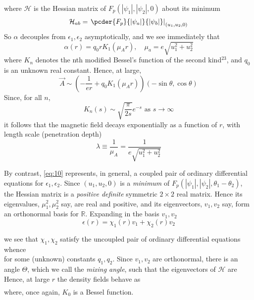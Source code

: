 where \( \mathcal{H} \) is the Hessian matrix of 
\( F_p(|\psi_1|, |\psi_2|, 0) \) about its minimum 
\begin{equation}
    \mathcal{H}_{ab} = \left. \pcder{F_p}{|\psi_a|}{|\psi_b|} 
        \right|_{(u_1, u_2, 0)}
    \label{eq:12}
\end{equation}
So \( \alpha \) decouples from \( \epsilon_1, \epsilon_2\) asymptotically, and 
we see immediately that
\begin{equation}
    \alpha(r) = q_0 r K_1(\mu_A r), \quad
    \mu_a = e\sqrt{u_1^2 + u_2^2}
    \label{eq:13}
\end{equation}
where \( K_n \) denotes the nth modified Bessel’s function of the second 
kind\( ^{23} \), and \( q_0 \) is an unknown real constant. Hence, at large,
\begin{equation}
    \vec{A} \sim \left( -\frac{1}{er} + q_0 K_1(\mu_A r) \right)
        (-\sin\theta, \cos\theta)
    \label{eq:14}
\end{equation}
Since, for all \( n \), 
\begin{equation}
    K_n(s) \sim \sqrt{\frac{\pi}{2s}}e^{-s} \text{ as } s \rightarrow \infty
    \label{eq:15}
\end{equation}
it follows that the magnetic field decays exponentially as a function of 
\( r \), with length scale (penetration depth)
\begin{equation}
    \lambda \equiv \frac{1}{\mu_A} = \frac{1}{e\sqrt{u_1^2 + u_2^2}}
    \label{eq:16}
\end{equation}

By contrast, \eqref{eq:10} represents, in general, a coupled pair of ordinary 
differential equations for \( \epsilon_1, \epsilon_2 \). Since 
\( (u_1, u_2, 0 ) \) is a \textit{minimum} of 
\( F_p(|\psi_1|, |\psi_2|, \theta_1 - \theta_2) \), the Hessian matrix is a 
\textit{positive definite} symmetric \( 2\times2 \) real matrix. Hence its 
eigenvalues, \( \mu_1^2, \mu_2^2\) say, are real and positive, and its 
eigenvectors, \( v_1, v_2 \) say, form an orthonormal basis for 
\( \mathbb{R} \). Expanding in the basis \( v_1, v_2 \)
\begin{equation}
    \epsilon(r) = \chi_1(r) v_1 + \chi_2(r) v_2
    \label{eq:17}
\end{equation}

we see that \( \chi_1, \chi_2 \) satisfy the uncoupled pair of ordinary 
differential equations
\begin{equation}
    \label{eq:18}
\end{equation}
whence 
\begin{equation}
    \label{eq:19}
\end{equation}
for some (unknown) constants \( q_1, q_2 \). Since \( v_1, v_2 \) are 
orthonormal, there is an angle \( \Theta \), which we call the \emph{mixing 
angle}, such that the eigenvectors of \( \mathcal{H} \) are
\begin{equation}
    \label{eq:20}
\end{equation}
Hence, at large \( r \) the density fields behave as
\begin{gather}
    \nonumber
    \label{eq:21}
\end{gather}
where, once again, \( K_0 \) is a Bessel function.

